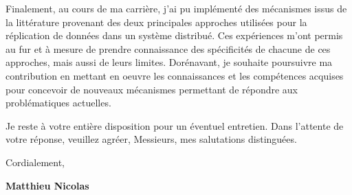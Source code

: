 \documentclass[11pt,a4paper,sans]{moderncv}        %
\newcommand{\tab}{\quad \quad}
\begin{document}

\tab Finalement, au cours de ma carrière, j'ai pu implémenté des mécanismes issus de la littérature
provenant des deux principales approches utilisées pour la réplication de données dans un système distribué.
Ces expériences m'ont permis au fur et à mesure de prendre connaissance
des spécificités de chacune de ces approches, mais aussi de leurs limites.
Dorénavant, je souhaite poursuivre ma contribution en mettant en oeuvre les connaissances et les compétences acquises
pour concevoir de nouveaux mécanismes permettant de répondre aux problématiques actuelles.

\tab Je reste à votre entière disposition pour un éventuel entretien. Dans l'attente de votre réponse, veuillez agréer, Messieurs, mes salutations distinguées.


Cordialement,
\begin{flushright}
\textbf{Matthieu Nicolas}
\end{flushright}
\end{document}
